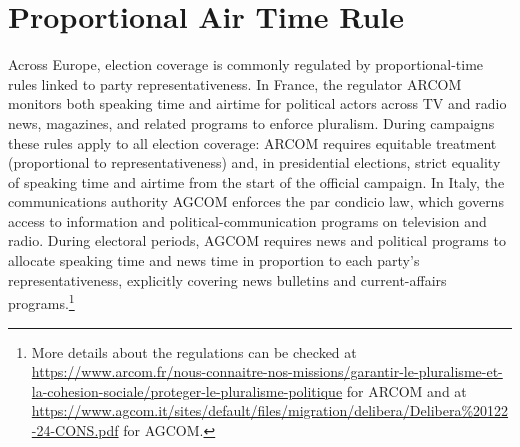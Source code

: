 \documentclass[12pt]{article}
\begin{document}
\FloatBarrier










\section{Proportional Air Time Rule}

\label{sec:counter}


Across Europe, election coverage is commonly regulated by proportional-time rules linked to party representativeness. In France, the regulator ARCOM monitors both speaking time and airtime for political actors across TV and radio news, magazines, and related programs to enforce pluralism. During campaigns these rules apply to all election coverage: ARCOM requires equitable treatment (proportional to representativeness) and, in presidential elections, strict equality of speaking time and airtime from the start of the official campaign. In Italy, the communications authority AGCOM enforces the par condicio law, which governs access to information and political-communication programs on television and radio. During electoral periods, AGCOM requires news and political programs to allocate speaking time and news time in proportion to each party’s representativeness, explicitly covering news bulletins and current-affairs programs.\footnote{More details about the regulations can be checked at  \href{https://www.arcom.fr/nous-connaitre-nos-missions/garantir-le-pluralisme-et-la-cohesion-sociale/proteger-le-pluralisme-politique}{https://www.arcom.fr/nous-connaitre-nos-missions/garantir-le-pluralisme-et-la-cohesion-sociale/proteger-le-pluralisme-politique} for ARCOM and at \href{https://www.agcom.it/sites/default/files/migration/delibera/Delibera\%20122-24-CONS.pdf}{https://www.agcom.it/sites/default/files/migration/delibera/Delibera\%20122-24-CONS.pdf} for AGCOM. }





\end{document}
